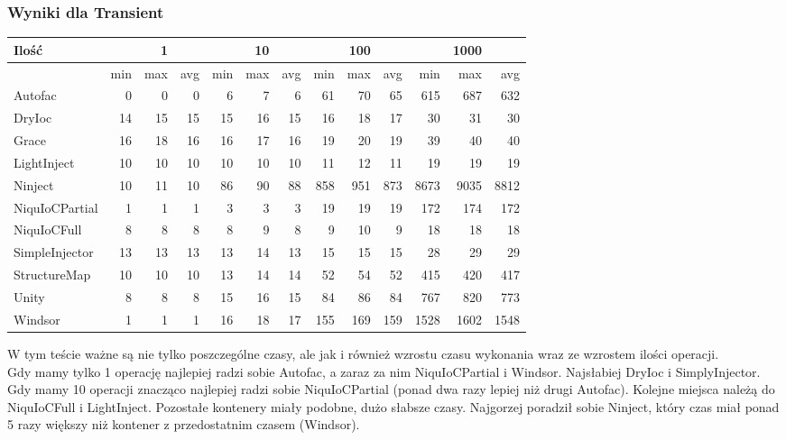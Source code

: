 \documentclass[12pt]{article}
\begin{document}
\subsubsection{Wyniki dla Transient}
\begin{center}
\begin{small}
	\begin{tabular}{ | l | r r r | r r r | r r r | r r r | }
    		\hline
     		Ilość & & 1 & & & 10 & & & 100 & & & 1000 & \\ \hline
     		 & min & max & avg & min & max & avg & min & max & avg & min & max & avg \\ \hline
    		Autofac & 0 & 0 & 0 & 6 & 7 & 6 & 61 & 70 & 65 & 615 & 687 & 632 \\ \hline
		DryIoc & 14 & 15 & 15 & 15 & 16 & 15 & 16 & 18 & 17 & 30 & 31 & 30 \\ \hline
		Grace & 16 & 18 & 16 & 16 & 17 & 16 & 19 & 20 & 19 & 39 & 40 & 40 \\ \hline
		LightInject & 10 & 10 & 10 & 10 & 10 & 10 & 11 & 12 & 11 & 19 & 19 & 19 \\ \hline
		Ninject & 10 & 11 & 10 & 86 & 90 & 88 & 858 & 951 & 873 & 8673 & 9035 & 8812 \\ \hline
		NiquIoCPartial & 1 & 1 & 1 & 3 & 3 & 3 & 19 & 19 & 19 & 172 & 174 & 172 \\ \hline
		NiquIoCFull & 8 & 8 & 8 & 8 & 9 & 8 & 9 & 10 & 9 & 18 & 18 & 18 \\ \hline
		SimpleInjector & 13 & 13 & 13 & 13 & 14 & 13 & 15 & 15 & 15 & 28 & 29 & 29 \\ \hline
		StructureMap & 10 & 10 & 10 & 13 & 14 & 14 & 52 & 54 & 52 & 415 & 420 & 417 \\ \hline
		Unity & 8 & 8 & 8 & 15 & 16 & 15 & 84 & 86 & 84 & 767 & 820 & 773 \\ \hline
		Windsor & 1 & 1 & 1 & 16 & 18 & 17 & 155 & 169 & 159 & 1528 & 1602 & 1548 \\
    		\hline
  	\end{tabular}
\end{small}
\end{center}
W tym teście ważne są nie tylko poszczególne czasy, ale jak i również wzrostu czasu wykonania wraz ze wzrostem ilości operacji.\\
Gdy mamy tylko 1 operację najlepiej radzi sobie Autofac, a zaraz za nim NiquIoCPartial i Windsor. Najsłabiej DryIoc i SimplyInjector.\\
Gdy mamy 10 operacji znacząco najlepiej radzi sobie NiquIoCPartial (ponad dwa razy lepiej niż drugi Autofac). Kolejne miejsca należą do NiquIoCFull i LightInject. Pozostałe kontenery miały podobne, dużo słabsze czasy. Najgorzej poradził sobie Ninject, który czas miał ponad 5 razy większy niż kontener z przedostatnim czasem (Windsor).\\
\end{document}
